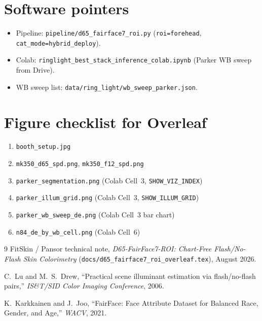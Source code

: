 \documentclass[11pt]{article}
\begin{document}
\section{Software pointers}
\begin{itemize}[leftmargin=*]
  \item Pipeline: \texttt{pipeline/d65\_fairface7\_roi.py}
        (\texttt{roi=forehead}, \texttt{cat\_mode=hybrid\_deploy}).
  \item Colab: \texttt{ringlight\_best\_stack\_inference\_colab.ipynb}
        (Parker WB sweep from Drive).
  \item WB sweep list: \texttt{data/ring\_light/wb\_sweep\_parker.json}.
\end{itemize}

\section{Figure checklist for Overleaf}
\begin{enumerate}[leftmargin=*]
  \item \texttt{booth\_setup.jpg}
  \item \texttt{mk350\_d65\_spd.png}, \texttt{mk350\_f12\_spd.png}
  \item \texttt{parker\_segmentation.png} (Colab Cell~3, \texttt{SHOW\_VIZ\_INDEX})
  \item \texttt{parker\_illum\_grid.png} (Colab Cell~3, \texttt{SHOW\_ILLUM\_GRID})
  \item \texttt{parker\_wb\_sweep\_de.png} (Colab Cell~3 bar chart)
  \item \texttt{n84\_de\_by\_wb\_cell.png} (Colab Cell~6)
\end{enumerate}

\begin{thebibliography}{9}
  FitSkin / Pansor technical note,
  \emph{D65-FairFace7-ROI: Chart-Free Flash/No-Flash Skin Colorimetry}
  (\texttt{docs/d65\_fairface7\_roi\_overleaf.tex}), August 2026.

  C.~Lu and M.~S.~Drew,
  ``Practical scene illuminant estimation via flash/no-flash pairs,''
  \emph{IS\&T/SID Color Imaging Conference}, 2006.

  K.~Karkkainen and J.~Joo,
  ``FairFace: Face Attribute Dataset for Balanced Race, Gender, and Age,''
  \emph{WACV}, 2021.
\end{thebibliography}
\end{document}
